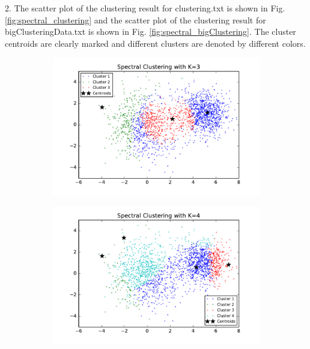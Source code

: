 \begin{description}
\begin{description}
\item{2.} The scatter plot of the clustering result for clustering.txt is shown in Fig. \ref{fig:spectral_clustering} and the scatter plot of the clustering result for bigClusteringData.txt is shown in Fig. \ref{fig:spectral_bigClustering}. The cluster centroids are clearly marked and different clusters are denoted by different colors. 

\begin{figure}[!h]
        \centering
        \begin{subfigure}[b]{0.475\textwidth}
            \centering
            \includegraphics[width=\textwidth]{./figures/clustering_spectral_3.pdf}
        \end{subfigure}
        \hfill
        \begin{subfigure}[b]{0.475\textwidth}  
            \centering 
            \includegraphics[width=\textwidth]{./figures/clustering_spectral_4.pdf}

\end{subfigure}
\end{figure}
\end{description}
\end{description}
